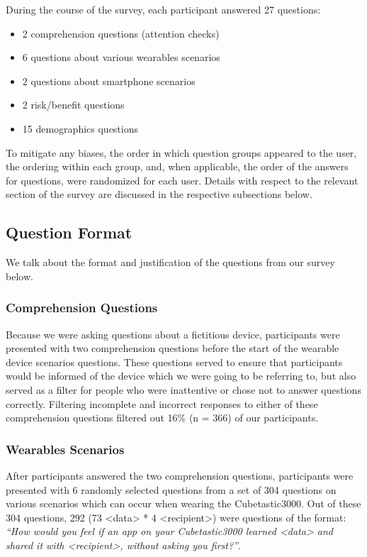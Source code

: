 \documentclass{acm_proc_article-sp}
\begin{document}
During the course of the survey, each participant answered 27 questions:   \\[-.8cm]

\begin{itemize} \itemsep1pt \parskip0pt 
\item 2 comprehension questions (attention checks)
\item 6 questions about various wearables scenarios 
\item 2 questions about smartphone scenarios 
\item 2 risk/benefit questions 
\item 15 demographics questions \\[-.8cm]
\end{itemize}

To mitigate any biases, the order in which question groups appeared to the user, the ordering within each group, and, when applicable, the order of the answers for questions, were randomized for each user. Details with respect to the relevant section of the survey are discussed in the respective subsections below.  

\subsection{Question Format} 
We talk about the format and justification of the questions from our survey below.

\subsubsection{Comprehension Questions}
Because we were asking questions about a fictitious device, participants were presented with two comprehension questions before the start of the wearable device scenarios questions. These questions served to ensure that participants would be informed of the device which we were going to be referring to, but also served as a filter for people who were inattentive or chose not to answer questions correctly. Filtering incomplete and incorrect responses to either of these comprehension questions filtered out 16\% (n = 366) of our participants. 

\subsubsection{Wearables Scenarios}

After participants answered the two comprehension questions, participants were presented with 6 randomly selected questions from a set of 304 questions on various scenarios which can occur when wearing the Cubetastic3000. Out of these 304 questions, 292 (73 <data> * 4 <recipient>) were questions of the format: \textit{``How would you feel if an app on your Cubetastic3000 learned <data> and shared it with <recipient>, without asking you first?''}. 
\end{document}
